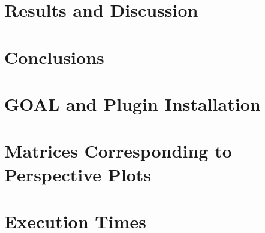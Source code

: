 \documentclass[a4paper,table]{report}
\newcommand{\goal}{GOAL}
\begin{document}
\chapter{Results and Discussion}
\label{chap_results}
\minitoc
\newpage


\chapter{Conclusions}
\label{chap_conclusions}
\newpage
% 


\appendix
\chapter{\goal{} and Plugin Installation}
\label{app_plugin}


\chapter{Matrices Corresponding to Perspective Plots}
\label{app_matrices}


\chapter{Execution Times}
\label{app_times}












\end{document}

